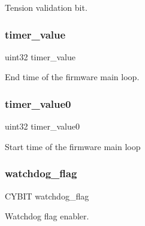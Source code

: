 Tension validation bit. \mbox{\label{globals_8c_ad47cd0e4d0fcf5739a88e52e949a8084}} 
\subsubsection{timer\+\_\+value}
{\footnotesize\ttfamily uint32 timer\+\_\+value}

End time of the firmware main loop. \mbox{\label{globals_8c_a9bab7f1b1cf2ba38d5968eee42644c32}} 
\subsubsection{timer\+\_\+value0}
{\footnotesize\ttfamily uint32 timer\+\_\+value0}

Start time of the firmware main loop \mbox{\label{globals_8c_a156a860c465529ff2f515725ab816a58}} 
\subsubsection{watchdog\+\_\+flag}
{\footnotesize\ttfamily C\+Y\+B\+IT watchdog\+\_\+flag}

Watchdog flag enabler. 